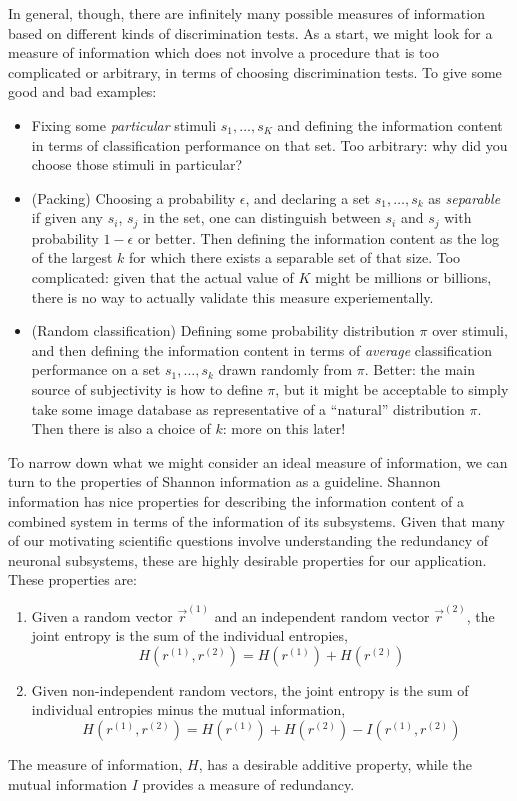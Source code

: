 \documentclass[12pt]{article}
\begin{document}
In general, though, there are infinitely many possible measures of
information based on different kinds of discrimination tests.  As a
start, we might look for a measure of information which does not
involve a procedure that is too complicated or arbitrary, in terms of
choosing discrimination tests.  To give some good and bad examples:
\begin{itemize}
\item Fixing some \emph{particular} stimuli $s_1,\hdots ,s_K$ and defining the information content in terms of classification performance on that set.  Too arbitrary: why did you choose those stimuli in particular?
\item (Packing) Choosing a probability $\epsilon$, and declaring a set $s_1,\hdots, s_k$ as \emph{separable} if given any $s_i$, $s_j$ in the set, one can distinguish between $s_i$ and $s_j$ with probability $1-\epsilon$ or better.  Then defining the information content as the log of the largest $k$ for which there exists a separable set of that size.  Too complicated: given that the actual value of $K$ might be millions or billions, there is no way to actually validate this measure experiementally.
\item (Random classification) Defining some probability distribution $\pi$ over stimuli, and then defining the information content in terms of \emph{average} classification performance on a set $s_1,\hdots, s_k$ drawn randomly from $\pi$.  Better: the main source of subjectivity is how to define $\pi$, but it might be acceptable to simply take some image database as representative of a ``natural'' distribution $\pi$.  Then there is also a choice of $k$: more on this later!
\end{itemize}

To narrow down what we might consider an ideal measure of information,
we can turn to the properties of Shannon information as a guideline.
Shannon information has nice properties for describing the information
content of a combined system in terms of the information of its
subsystems.  Given that many of our motivating scientific questions
involve understanding the redundancy of neuronal subsystems, these are
highly desirable properties for our application.  These properties
are:
\begin{enumerate}
\item Given a random vector $\vec{r}^{(1)}$ and an independent random vector $\vec{r}^{(2)}$, the joint entropy is the sum of the individual entropies,
\[
H(r^{(1)}, r^{(2)}) = H(r^{(1)}) + H(r^{(2)})
\]
\item Given non-independent random vectors, the joint entropy is the sum of individual entropies minus the mutual information,
\[
H(r^{(1)}, r^{(2)}) = H(r^{(1)}) + H(r^{(2)}) - I(r^{(1)}, r^{(2)})
\]
\end{enumerate}
The measure of information, $H$, has a desirable additive property,
while the mutual information $I$ provides a measure of redundancy.
\end{document}
